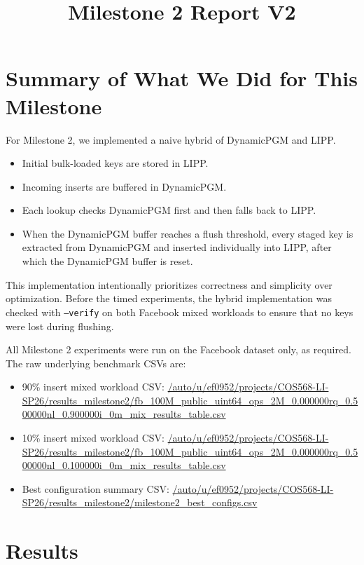 \documentclass[11pt]{article}
\title{Milestone 2 Report V2}
\date{}
\begin{document}
\maketitle

\section{Summary of What We Did for This Milestone}

For Milestone 2, we implemented a naive hybrid of DynamicPGM and LIPP.

\begin{itemize}
  \item Initial bulk-loaded keys are stored in LIPP.
  \item Incoming inserts are buffered in DynamicPGM.
  \item Each lookup checks DynamicPGM first and then falls back to LIPP.
  \item When the DynamicPGM buffer reaches a flush threshold, every staged key is extracted from DynamicPGM and inserted individually into LIPP, after which the DynamicPGM buffer is reset.
\end{itemize}

This implementation intentionally prioritizes correctness and simplicity over optimization. Before the timed experiments, the hybrid implementation was checked with \texttt{--verify} on both Facebook mixed workloads to ensure that no keys were lost during flushing.

All Milestone 2 experiments were run on the Facebook dataset only, as required. The raw underlying benchmark CSVs are:

\begin{itemize}
  \item 90\% insert mixed workload CSV: \url{/auto/u/ef0952/projects/COS568-LI-SP26/results_milestone2/fb_100M_public_uint64_ops_2M_0.000000rq_0.500000nl_0.900000i_0m_mix_results_table.csv}
  \item 10\% insert mixed workload CSV: \url{/auto/u/ef0952/projects/COS568-LI-SP26/results_milestone2/fb_100M_public_uint64_ops_2M_0.000000rq_0.500000nl_0.100000i_0m_mix_results_table.csv}
  \item Best configuration summary CSV: \url{/auto/u/ef0952/projects/COS568-LI-SP26/results_milestone2/milestone2_best_configs.csv}
\end{itemize}

\section{Results}
\end{document}
